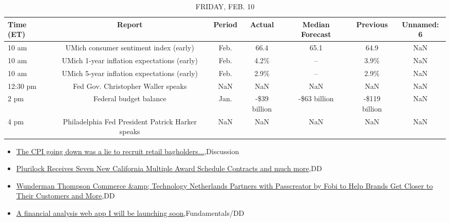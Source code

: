 \documentclass{article}%
\begin{document}
%


\begin{table}[htbp]%
\caption{FRIDAY, FEB. 10}%
\centering%
\begin{adjustbox}{width=1\textwidth}%
\begin{tabular}{lcccccc}
\toprule
Time (ET) &                                           Report & Period &       Actual & Median Forecast &      Previous & Unnamed: 6 \\
\midrule
    10 am &           UMich consumer sentiment index (early) &   Feb. &         66.4 &            65.1 &          64.9 &        NaN \\
    10 am &      UMich 1-year inflation expectations (early) &   Feb. &         4.2\% &              -- &          3.9\% &        NaN \\
    10 am &      UMich 5-year inflation expectations (early) &   Feb. &         2.9\% &              -- &          2.9\% &        NaN \\
 12:30 pm &               Fed Gov. Christopher Waller speaks &    NaN &          NaN &             NaN &           NaN &        NaN \\
     2 pm &                           Federal budget balance &   Jan. & -\$39 billion &    -\$63 billion & -\$119 billion &        NaN \\
     4 pm & Philadelphia Fed President Patrick Harker speaks &    NaN &          NaN &             NaN &           NaN &        NaN \\
\bottomrule
\end{tabular}
%
\end{adjustbox}%
\end{table}

%
\begin{itemize}%
\item%
\href{https://reddit.com/r/wallstreetbets/comments/10zejf3/the\_cpi\_going\_down\_was\_a\_lie\_to\_recruit\_retail/}{The CPI going down was a lie to recruit retail bagholders...},Discussion%
\item%
\href{https://reddit.com/r/Baystreetbets/comments/10z2yxf/plurilock\_receives\_seven\_new\_california\_multiple/}{Plurilock Receives Seven New California Multiple Award Schedule Contracts and much more},DD%
\item%
\href{https://reddit.com/r/Baystreetbets/comments/10yyj2e/wunderman\_thompson\_commerce\_technology/}{Wunderman Thompson Commerce \&amp; Technology Netherlands Partners with Passcreator by Fobi to Help Brands Get Closer to Their Customers and More},DD%
\item%
\href{https://reddit.com/r/StockMarket/comments/10zdmod/a\_financial\_analysis\_web\_app\_i\_will\_be\_launching/}{A financial analysis web app I will be launching soon},Fundamentals/DD%
\end{itemize}%
\end{document}
